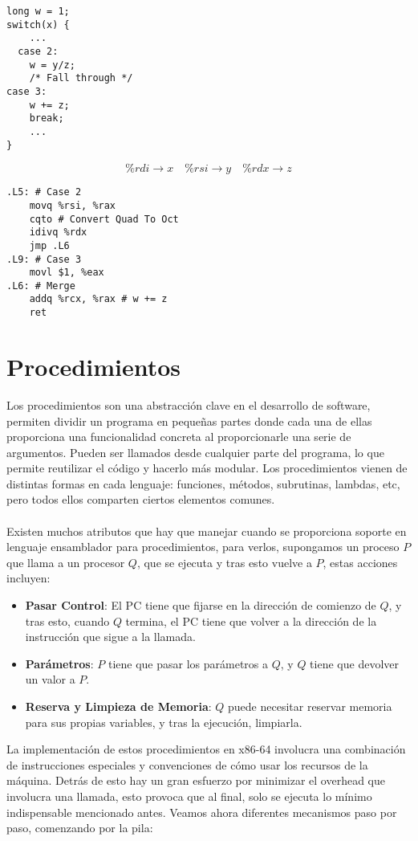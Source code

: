 \begin{center}
	\begin{minipage}{0.45\textwidth}
		\begin{verbatim}
long w = 1;
switch(x) {
    ...
  case 2:
    w = y/z;
    /* Fall through */ 
case 3:
    w += z;
    break;
    ...
}
\end{verbatim}
	\end{minipage}
	\begin{minipage}{0.45\textwidth}
		\begin{equation*}
			\%rdi \rightarrow x \quad \%rsi \rightarrow y \quad \%rdx \rightarrow z
		\end{equation*}
		\begin{verbatim}
.L5: # Case 2
    movq %rsi, %rax
    cqto # Convert Quad To Oct
    idivq %rdx 
    jmp .L6
.L9: # Case 3
    movl $1, %eax
.L6: # Merge
    addq %rcx, %rax # w += z
    ret 

\end{verbatim}
	\end{minipage}
\end{center}

\section{Procedimientos}
Los procedimientos son una abstracción clave en el desarrollo de software, permiten dividir un programa en pequeñas partes
donde cada una de ellas proporciona una funcionalidad concreta al proporcionarle una serie de argumentos.
Pueden ser llamados desde cualquier parte del programa, lo que permite reutilizar el código y hacerlo más modular. Los procedimientos vienen
de distintas formas en cada lenguaje: funciones, métodos, subrutinas, lambdas, etc, pero todos ellos comparten ciertos elementos comunes.
\\ \\
Existen muchos atributos que hay que manejar cuando se proporciona soporte en lenguaje ensamblador para procedimientos, para verlos, supongamos un proceso
$P$ que llama a un procesor $Q$, que se ejecuta y tras esto vuelve a $P$, estas acciones incluyen:
\begin{itemize}
	\item \textbf{Pasar Control}: El PC tiene que fijarse en la dirección de comienzo de $Q$, y tras esto, cuando $Q$ termina, el PC tiene que volver a la dirección de la instrucción que sigue a la llamada.
	\item \textbf{Parámetros}: $P$ tiene que pasar los parámetros a $Q$, y $Q$ tiene que devolver un valor a $P$.
	\item \textbf{Reserva y Limpieza de Memoria}: $Q$ puede necesitar reservar memoria para sus propias variables, y tras la ejecución, limpiarla.
\end{itemize}
La implementación de estos procedimientos en x86-64 involucra una combinación de instrucciones especiales y convenciones de cómo usar los recursos de la máquina.
Detrás de esto hay un gran esfuerzo por minimizar el overhead que involucra una llamada, esto provoca que al final, solo se ejecuta lo mínimo indispensable mencionado
antes. Veamos ahora diferentes mecanismos paso por paso, comenzando por la pila:
